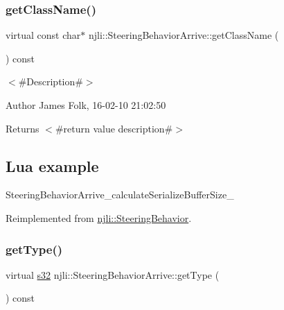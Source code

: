 \subsubsection{\texorpdfstring{get\+Class\+Name()}{getClassName()}}
{\footnotesize\ttfamily virtual const char$\ast$ njli\+::\+Steering\+Behavior\+Arrive\+::get\+Class\+Name (\begin{DoxyParamCaption}{ }\end{DoxyParamCaption}) const\hspace{0.3cm}{\ttfamily [virtual]}}



$<$\#\+Description\#$>$ 

\begin{DoxyAuthor}{Author}
James Folk, 16-\/02-\/10 21\+:02\+:50
\end{DoxyAuthor}
\begin{DoxyReturn}{Returns}
$<$\#return value description\#$>$
\end{DoxyReturn}
\hypertarget{classnjli_1_1_steering_behavior_wander_ex1}{}\subsection{Lua example}\label{classnjli_1_1_steering_behavior_wander_ex1}

\begin{DoxyCodeInclude}
\end{DoxyCodeInclude}
Steering\+Behavior\+Arrive\+\_\+calculate\+Serialize\+Buffer\+Size\+\_\+ 

Reimplemented from \mbox{\hyperlink{classnjli_1_1_steering_behavior_abb58d6982dc295fc3e90f096f51b0ef8}{njli\+::\+Steering\+Behavior}}.

\mbox{\label{classnjli_1_1_steering_behavior_arrive_ad2e5b01bf3703716d07b3e49434761c4}} 
\subsubsection{\texorpdfstring{get\+Type()}{getType()}}
{\footnotesize\ttfamily virtual \mbox{\hyperlink{_util_8h_aa62c75d314a0d1f37f79c4b73b2292e2}{s32}} njli\+::\+Steering\+Behavior\+Arrive\+::get\+Type (\begin{DoxyParamCaption}{ }\end{DoxyParamCaption}) const\hspace{0.3cm}{\ttfamily [virtual]}}



